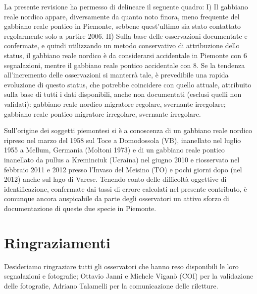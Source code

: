 La presente revisione ha permesso di delineare il seguente quadro: I) Il
gabbiano reale nordico appare, diversamente da quanto noto finora, meno
frequente del gabbiano reale pontico in Piemonte, sebbene
quest{\textquoteright}ultimo sia stato contattato regolarmente solo a
partire 2006. II) Sulla base delle osservazioni documentate e
confermate, e quindi utilizzando un metodo conservativo di attribuzione
dello status, il gabbiano reale nordico \`e da considerarsi accidentale in
Piemonte con 6 segnalazioni, mentre il gabbiano reale pontico accidentale con 8.
Se la tendenza all{\textquoteright}incremento delle osservazioni si
manterr\`a tale, \`e prevedibile una rapida evoluzione di questo
status, che potrebbe coincidere con quello attuale, attribuito sulla
base di tutti i dati disponibili, anche non documentati (esclusi quelli
non validati): gabbiano reale nordico migratore regolare, svernante irregolare;
gabbiano reale pontico migratore irregolare, svernante irregolare. 

Sull{\textquoteright}origine dei soggetti piemontesi si \`e a conoscenza
di un gabbiano reale nordico ripreso nel marzo del 1958 sul Toce a Domodossola
(VB), inanellato nel luglio 1955 a Mellum, Germania (Moltoni 1973) e di
un gabbiano reale pontico inanellato da pullus a Kreminciuk (Ucraina) nel giugno
2010 e riosservato nel febbraio 2011 e 2012 presso
l{\textquoteright}Invaso del Meisino (TO) e pochi giorni dopo (nel
2012) anche sul lago di Varese. Tenendo conto delle difficolt\`a
oggettive di identificazione, confermate dai tassi di errore calcolati
nel presente contributo, \`e comunque ancora auspicabile da parte degli
osservatori un attivo sforzo di documentazione di queste due specie in
Piemonte.

\section*{Ringraziamenti}

Desideriamo ringraziare tutti gli osservatori che hanno reso disponibili
le loro segnalazioni e fotografie; Ottavio Janni e Michele Vigan\`o
(COI) per la validazione delle fotografie, Adriano Talamelli per la
comunicazione delle riletture.

